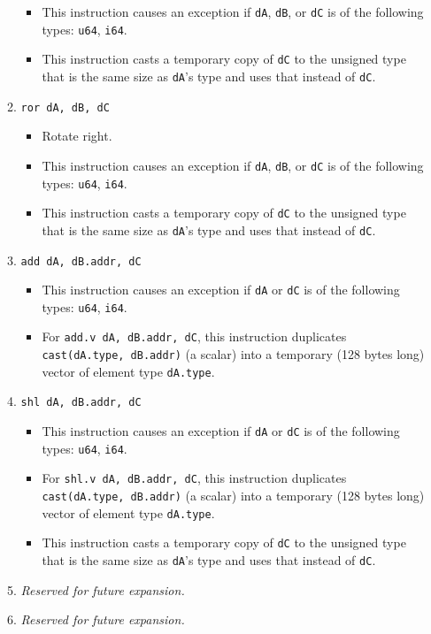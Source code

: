 \documentclass{article}
\begin{document}
\begin{itemize}
\begin{enumerate}
\begin{itemize}
				\item This instruction causes an exception if \texttt{dA},
				\texttt{dB}, or \texttt{dC} is of the following types:
				\texttt{u64}, \texttt{i64}.

				\item This instruction casts a temporary copy of
				\texttt{dC} to the unsigned type that is the same size as
				\texttt{dA}'s type and uses that instead of \texttt{dC}.
				\end{itemize}
			\item \texttt{ror dA, dB, dC}
				\begin{itemize}
				\item Rotate right.

				\item This instruction causes an exception if \texttt{dA},
				\texttt{dB}, or \texttt{dC} is of the following types:
				\texttt{u64}, \texttt{i64}.

				\item This instruction casts a temporary copy of
				\texttt{dC} to the unsigned type that is the same size as
				\texttt{dA}'s type and uses that instead of \texttt{dC}.
				\end{itemize}

			\item \texttt{add dA, dB.addr, dC}
				\begin{itemize}
				\item This instruction causes an exception if \texttt{dA}
				or \texttt{dC} is of the following types: \texttt{u64},
				\texttt{i64}.

				\item For \texttt{add.v dA, dB.addr, dC}, this instruction
				duplicates \texttt{cast(dA.type, dB.addr)} (a scalar) into
				a temporary (128 bytes long) vector of element type
				\texttt{dA.type}.
				\end{itemize}
			\item \texttt{shl dA, dB.addr, dC}
				\begin{itemize}
				\item This instruction causes an exception if \texttt{dA}
				or \texttt{dC} is of the following types: \texttt{u64},
				\texttt{i64}.

				\item For \texttt{shl.v dA, dB.addr, dC}, this instruction
				duplicates \texttt{cast(dA.type, dB.addr)} (a scalar) into
				a temporary (128 bytes long) vector of element type
				\texttt{dA.type}.

				\item This instruction casts a temporary copy of
				\texttt{dC} to the unsigned type that is the same size as
				\texttt{dA}'s type and uses that instead of \texttt{dC}.
				\end{itemize}
			\item \textit{Reserved for future expansion.}
			\item \textit{Reserved for future expansion.}
			\end{enumerate}
		\end{itemize}
		\newpage
\end{document}
